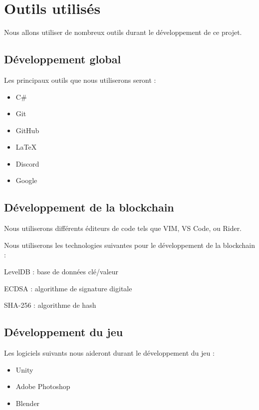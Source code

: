 \documentclass{article}
\begin{document}
\section{Outils utilisés}
Nous allons utiliser de nombreux outils durant le développement de ce projet.

\subsection{Développement global}
Les principaux outils que nous utiliserons seront :

\begin{itemize}
    \item C\#
    \item Git
    \item GitHub
    \item \LaTeX
    \item Discord
    \item Google

\end{itemize}

\subsection{Développement de la blockchain}
Nous utiliserons différents éditeurs de code tels que VIM, VS Code, ou Rider.

Nous utiliserons les technologies suivantes pour le développement de la blockchain :
\begin{itemize}
\begin{samepage}
    \item LevelDB : base de données clé/valeur
    \item ECDSA : algorithme de signature digitale
    \item SHA-256 : algorithme de hash
\end{samepage}
\end{itemize}

\subsection{Développement du jeu}

Les logiciels suivants nous aideront durant le développement du jeu :
\begin{itemize}
    \item Unity
    \item Adobe Photoshop
    \item Blender
\end{itemize}
\end{document}
